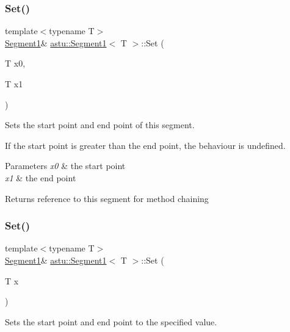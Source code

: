 \subsubsection{\texorpdfstring{Set()}{Set()}\hspace{0.1cm}{\footnotesize\ttfamily [1/2]}}
{\footnotesize\ttfamily template$<$typename T$>$ \\
\hyperlink{classastu_1_1Segment1}{Segment1}\& \hyperlink{classastu_1_1Segment1}{astu\+::\+Segment1}$<$ T $>$\+::Set (\begin{DoxyParamCaption}\item[{T}]{x0,  }\item[{T}]{x1 }\end{DoxyParamCaption})\hspace{0.3cm}{\ttfamily [inline]}}

Sets the start point and end point of this segment.

If the start point is greater than the end point, the behaviour is undefined.


\begin{DoxyParams}{Parameters}
{\em x0} & the start point \\
\hline
{\em x1} & the end point \\
\hline
\end{DoxyParams}
\begin{DoxyReturn}{Returns}
reference to this segment for method chaining 
\end{DoxyReturn}
\mbox{\label{classastu_1_1Segment1_aa7e8932625f352606726e966c1d38ba4}} 
\subsubsection{\texorpdfstring{Set()}{Set()}\hspace{0.1cm}{\footnotesize\ttfamily [2/2]}}
{\footnotesize\ttfamily template$<$typename T$>$ \\
\hyperlink{classastu_1_1Segment1}{Segment1}\& \hyperlink{classastu_1_1Segment1}{astu\+::\+Segment1}$<$ T $>$\+::Set (\begin{DoxyParamCaption}\item[{T}]{x }\end{DoxyParamCaption})\hspace{0.3cm}{\ttfamily [inline]}}

Sets the start point and end point to the specified value.


